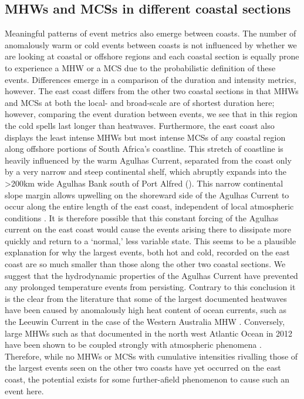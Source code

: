 \documentclass[a4paper,10pt,review]{elsarticle}
\begin{document}
\subsection{MHWs and MCSs in different coastal sections}
Meaningful patterns of event metrics also emerge between coasts. The number of anomalously warm or cold events between coasts is not influenced by whether we are looking at coastal or offshore regions and each coastal section is equally prone to experience a MHW or a MCS due to the probabilistic definition of these events. Differences emerge in a comparison of the duration and intensity metrics, however. The east coast differs from the other two coastal sections in that MHWs and MCSs at both the local- and broad-scale are of shortest duration here; however, comparing the event duration between events, we see that in this region the cold spells last longer than heatwaves. Furthermore, the east coast also displays the least intense MHWs but most intense MCSs of any coastal region along offshore portions of South Africa's coastline. This stretch of coastline is heavily influenced by the warm Agulhas Current, separated from the coast only by a very narrow and steep continental shelf, which abruptly expands into the >200km wide Agulhas Bank south of Port Alfred (). This narrow continental slope margin allows upwelling on the shoreward side of the Agulhas Current to occur along the entire length of the east coast, independent of local atmospheric conditions \citep{Lutjeharms2000}. It is therefore possible that this constant forcing of the Agulhas current on the east coast would cause the events arising there to dissipate more quickly and return to a `normal,' less variable state. This seems to be a plausible explanation for why the largest events, both hot and cold, recorded on the east coast are so much smaller than those along the other two coastal sections. We suggest that the hydrodynamic properties of the Agulhas Current have prevented any prolonged temperature events from persisting. Contrary to this conclusion it is the clear from the literature that some of the largest documented heatwaves have been caused by anomalously high heat content of ocean currents, such as the Leeuwin Current in the case of the Western Australia MHW \citep{Feng2013, Pearce2013, Wernberg2013}. Conversely, large MHWs such as that documented in the north west Atlantic Ocean in 2012 have been shown to be coupled strongly with atmospheric phenomena \citep{Mills2012, Chen2014, Chen2015}. Therefore, while no MHWs or MCSs with cumulative intensities rivalling those of the largest events seen on the other two coasts have yet occurred on the east coast, the potential exists for some further-afield phenomenon to cause such an event here.
\end{document}
